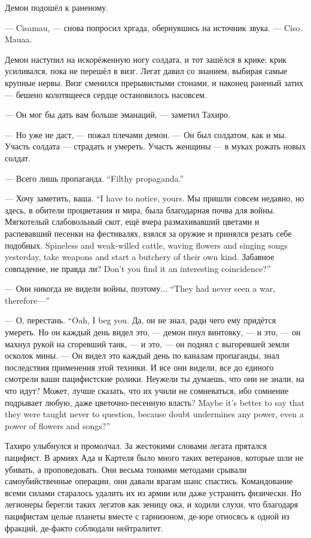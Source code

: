 Демон подошёл к раненому.

--- Cisamau, --- снова попросил хргада, обернувшись на источник звука.
--- Ciso. Mauaa.

Демон наступил на искорёженную ногу солдата, и тот зашёлся в крике;
крик усиливался, пока не перешёл в визг.
Легат давил со знанием, выбирая самые крупные нервы.
Визг сменился прерывистыми стонами, и наконец раненый затих --- бешено колотящееся сердце остановилось насовсем.

--- Он мог бы дать вам больше эманаций, --- заметил Тахиро.

--- Но уже не даст, --- пожал плечами демон.
--- Он был солдатом, как и мы.
Участь солдата --- страдать и умереть.
Участь женщины --- в муках рожать новых солдат.

{--- Всего лишь пропаганда.}
{``Filthy propaganda.''}

{--- Хочу заметить, ваша.}
{``I have to notice, yours.}
Мы пришли совсем недавно, но здесь, в обители процветания и мира, была благодарная почва для войны.
{Мягкотелый слабовольный скот, ещё вчера размахивавший цветами и распевавший песенки на фестивалях, взялся за оружие и принялся резать себе подобных.}
{Spineless and weak-willed cattle, waving flowers and singing songs yesterday, take weapons and start a butchery of their own kind.}
{Забавное совпадение, не правда ли?}
{Don't you find it an interesting coincidence?''}

{--- Они никогда не видели войны, поэтому...}
{``They had never seen a war, therefore---''}

{--- О, перестань.}
{``Oah, I beg you.}
Да, он не знал, ради чего ему придётся умереть.
Но он каждый день видел это, --- демон пнул винтовку, --- и это, --- он махнул рукой на сгоревший танк, --- и это, --- он поднял с выгоревшей земли осколок мины.
--- Он видел это каждый день по каналам пропаганды, знал последствия применения этой техники.
И все они видели, все до единого смотрели ваши пацифистские ролики.
Неужели ты думаешь, что они не знали, на что идут?
{Может, лучше сказать, что их учили не сомневаться, ибо сомнение подрывает любую, даже цветочно-песенную власть?}
{Maybe it's better to say that they were taught never to question, because doubt undermines any power, even a power of flowers and songs?''}

Тахиро улыбнулся и промолчал.
За жестокими словами легата прятался пацифист.
В армиях Ада и Картеля было много таких ветеранов, которые шли не убивать, а проповедовать.
Они весьма тонкими методами срывали самоубийственные операции, они давали врагам шанс спастись.
Командование всеми силами старалось удалить их из армии или даже устранить физически.
Но легионеры берегли таких легатов как зеницу ока, и ходили слухи, что благодаря пацифистам целые планеты вместе с гарнизоном, де-юре относясь к одной из фракций, де-факто соблюдали нейтралитет.

